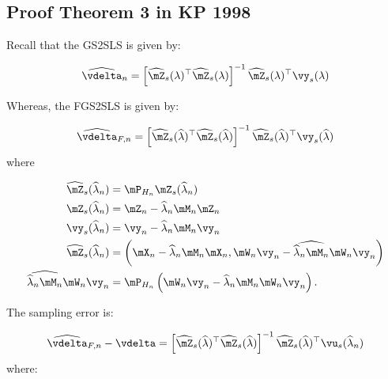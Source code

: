 \documentclass[english,12pt]{book}\usepackage[]{graphicx}\usepackage[]{xcolor}
\begin{document}
\begin{subappendices}
\section{Proof Theorem 3 in KP 1998}

Recall that the GS2SLS is given by:

\begin{equation}
  \widehat{\vdelta}_n = \left[\widehat{\mZ}_s(\lambda)^\top\widehat{\mZ}_s(\lambda)\right]^{-1}\widehat{\mZ}_s(\lambda)^\top\vy_s(\lambda)
\end{equation}

Whereas, the FGS2SLS is given by:

\begin{equation}
  \widehat{\vdelta}_{F, n} = \left[\widehat{\mZ}_s(\widehat{\lambda})^\top\widehat{\mZ}_s(\widehat{\lambda})\right]^{-1}\widehat{\mZ}_s(\widehat{\lambda})^\top\vy_s(\widehat{\lambda})
\end{equation}
%
where

\begin{equation}
  \begin{aligned}
    \widehat{\mZ}_s(\widehat{\lambda}_n) & = \mP_{H_n}\mZ_s(\widehat{\lambda}_n) \\
    \mZ_s(\widehat{\lambda}_n) & = \mZ_n - \widehat{\lambda}_n\mM_n\mZ_n \\
    \vy_s(\widehat{\lambda}_n) & = \vy_n - \widehat{\lambda}_n\mM_n\vy_n \\
    \widehat{\mZ}_s(\widehat{\lambda}_n) & = \left(\mX_n - \widehat{\lambda}_n\mM_n\mX_n, \mW_n\vy_n - \widehat{\widehat{\lambda}_n\mM_n}\mW_n\vy_n\right) \\
    \widehat{\widehat{\lambda}_n\mM_n}\mW_n\vy_n & = \mP_{H_n}\left(\mW_n\vy_n - \widehat{\lambda}_n\mM_n\mW_n\vy_n\right).
 \end{aligned}
\end{equation}

The sampling error is:

\begin{equation}
  \widehat{\vdelta}_{F, n} - \vdelta = \left[\widehat{\mZ}_s(\widehat{\lambda})^\top\widehat{\mZ}_s(\widehat{\lambda})\right]^{-1}\widehat{\mZ}_s(\widehat{\lambda})^\top\vu_s(\widehat{\lambda}_n)
\end{equation}
%
where:


\end{subappendices}
\end{document}
